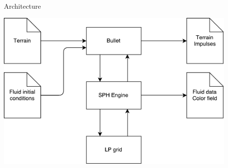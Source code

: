 \documentclass[8pt,sans,mathserif,aspectratio=43]{beamer}
\begin{document}
\begin{frame}{Architecture}
  \begin{center}
    \includegraphics[width=0.9\textwidth, keepaspectratio]{figures/architecture.pdf}
  \end{center}
\end{frame}

\end{document}

